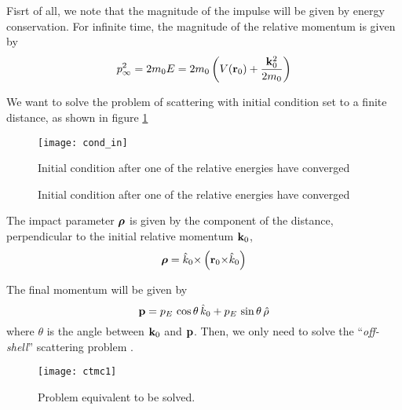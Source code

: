 Fisrt of all, we note that the magnitude of the impulse will be given by energy conservation. For infinite time, the magnitude of the relative momentum is given by
\begin{equation}
  \label{Q:ctmc_magnitude}
p_{\infty}^{2}= 2 m_{0} E = 2 m_{0} \left(V(\mathbf{r}_{0}) + \frac{\mathbf{k}^{2}_{0}}{2 m_{0}}  \right)
\end{equation}

We want to solve the problem of scattering with initial condition set
to a finite distance, as shown in figure \ref{f:cond-in}

\begin{figure}[h]\label{f:cond-in}
\centering
 \texttt{[image: cond\_in]}
\caption{Initial condition after one of the relative energies have
converged}
\end{figure}

\begin{figure}[h]\label{f:cond-ini}
\caption{Initial condition after one of the relative energies have
converged}
\end{figure}


The impact parameter $\boldsymbol{\rho}$ is given by the component of the distance,
perpendicular to the initial relative momentum $\mathbf{k}_{0}$,
\begin{equation}\label{Q:rho}
\boldsymbol{\rho} = \hat{k}_{0} {\times} \left( \mathbf{r}_{0} {\times} \hat{k}_{0} \right)
\end{equation}

The final momentum will be given by
\begin{equation}\label{Q:finalmom}
\mathbf{p} = p_{E} \, \cos{\theta} \, \hat{k}_{0}+ p_{E}\, \sin{\theta}\,
\hat{\rho}
\end{equation}
%
where $\theta $ is the angle between $\mathbf{k}_{0}$ and $\mathbf{p}$. Then,
we only need to solve the ``\textit{off-shell}'' scattering problem
\cite{Fiol2000JPBp2847}.

\begin{figure}[!htpb]
  \centering
 \texttt{[image: ctmc1]}
  \caption{Problem equivalent to be solved.
  \label{f:ctmc1}}
\end{figure}



